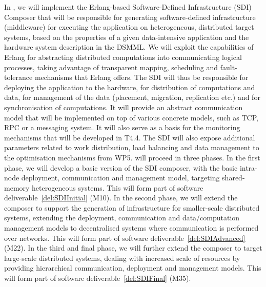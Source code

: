\begin{Workpackage}{\thewpno}
\begin{Task}
In \theTask, we will implement the Erlang-based Software-Defined Infrastructure (SDI) Composer that will be responsible for
generating software-defined infrastructure (middleware) for executing the application on heterogeneous, distributed 
target systems, based on the properties of a given data-intensive application and the hardware system description in the DSMML. 
We will exploit the capabilities of Erlang for abstracting distributed computations into communicating logical processes, taking advantage of transparent mapping, scheduling and fault-tolerance mechanisms that Erlang offers. The SDI will thus be responsible for deploying the application to the hardware, for distribution of 
computations and data,  for management of the data (placement, migration, replication etc.) and 
for synchronisation of computations. It will provide an abstract communication model that will be implemented on top
of various concrete models, such as TCP, RPC or a messaging system. 
It will also serve as a basis for the monitoring mechanisms that will be developed in T4.4. 
The SDI will also expose additional parameters related to work distribution, load balancing and data 
management to the optimisation mechanisms from WP5. \theTask will proceed in three phases. In the first phase,
we will develop a basic version of the SDI composer, with the basic intra-node deployment, communication
and management model, targeting shared-memory heterogeneous systems. This will form part of software deliverable~\ref{del:SDIInitial} (M10).
In the second phase, we will extend the composer to support the generation
of infrastructure for smaller-scale distributed systems, extending the deployment, communication 
and data/computation management models to decentralised systems where communication is performed over networks. This will form part of software deliverable~\ref{del:SDIAdvanced} (M22).
In the third and final phase, we will further extend the composer to target large-scale distributed systems,
dealing with increased scale of resources by providing hierarchical communication, deployment and management
models. This will form part of software deliverable~\ref{del:SDIFinal} (M35).


\end{Task}
\end{Workpackage}
